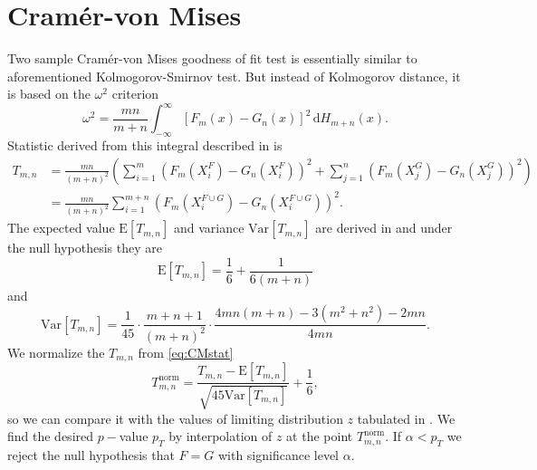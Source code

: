\section{Cram\'{e}r-von Mises}
Two sample Cram\'{e}r-von Mises goodness of fit test is essentially similar to aforementioned Kolmogorov-Smirnov test. But instead of Kolmogorov distance, it is based on the $\omega^2$ criterion
\begin{equation}
\omega^2 = \frac{mn}{m+n} \int_{-\infty}^\infty \left[F_m(x) - G_n(x) \right]^2 \,\mathrm{d} H_{m+n}(x).
\end{equation} 
Statistic derived from this integral described in \cite{Anderson1962} is
\begin{align}
T_{m,n} & = \frac{mn}{(m+n)^2}\left( \sum_{i=1}^m \left( F_m(X^F_i) - G_n(X^F_i)\right)^2 + \sum_{j=1}^n \left( F_m(X^G_j) - G_n(X^G_j)\right)^2 \right) \\
& = \frac{mn}{(m+n)^2} \sum_{i=1}^{m+n} \left( F_m(X^{F\cup G}_i) - G_n(X^{F\cup G}_i)\right)^2 .
\label{eq:CMstat} %
\end{align}
The expected value $\mathrm{E} [T_{m,n}]$ and variance $\mathrm{Var} [T_{m,n}]$ are derived in \cite{Anderson1962} and  under the null hypothesis they are 
\begin{equation}
\mathrm{E} [T_{m,n}] = \frac{1}{6} + \frac{1}{6(m+n)}
\end{equation}
and
\begin{equation}
\mathrm{Var} [T_{m,n}] = \frac{1}{45} \cdot \frac{m+n+1}{(m+n)^2} \cdot \frac{4mn(m+n) - 3(m^2 + n^2)-2mn}{4mn}.
\end{equation}
We normalize the $T_{m,n}$ from \ref{eq:CMstat}
\begin{equation}
T_{m,n}^\mathrm{norm} = \frac{T_{m,n}-\mathrm{E}[T_{m,n}]}{\sqrt{45\mathrm{Var}[T_{m,n}]}} + \frac{1}{6},
\end{equation}
so we can compare it with the values of limiting distribution $z$ tabulated in \cite{AndersonDarling1952}. We find the desired $p-$value $p_T$ by interpolation of $z$ at the point $T_{m,n}^\mathrm{norm}$. If $\alpha < p_T$ we reject the null hypothesis that $F = G $ with significance level $\alpha$.


